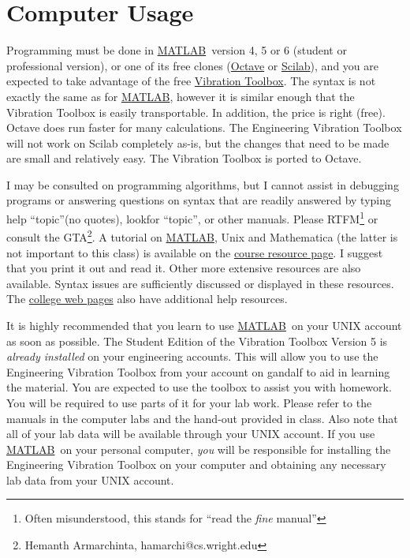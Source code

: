 \documentclass[10pt]{article}
\newcommand{\comp}[1]{{{\small\textsf{#1}}}}
\newcommand{\matlab}{\href{http://www.mathworks.com}{M{\small ATLAB}}}
\begin{document}
\section{Computer Usage}
Programming must be done in \matlab\  version 4, 5 or 6 (student or professional version), or one of its free clones (\href{http://www.octave.org/}{Octave} or \href{http://www-rocq.inria.fr/scilab/}{Scilab}), and you are expected to take advantage of the free \href{http://www.cs.wright.edu/vtoolbox}{Vibration Toolbox}.  The syntax is not exactly the same as for \matlab, however it is similar enough that the Vibration Toolbox is easily transportable. In addition, the price is right (free). Octave does run faster for many calculations. The Engineering Vibration Toolbox will not work on Scilab completely as-is, but the changes that need to be made are small and relatively easy. The Vibration Toolbox is ported to Octave.  

I may be consulted on programming algorithms, but I cannot assist in debugging programs or answering questions on syntax that are readily answered by typing \comp{help ``topic''}(no quotes),  \comp{lookfor ``topic''}, or other manuals. Please RTFM\footnote{Often misunderstood, this stands for ``read the \emph{fine} manual''} or consult the GTA\footnote{Hemanth Armarchinta, hamarchi@cs.wright.edu}.  A tutorial on \matlab, Unix and Mathematica (the latter is not important to this class) is available on the \href{http://www.cs.wright.edu/people/faculty/jslater/vibration.html}{course resource page}.  I suggest that you print it out and read it.  Other more extensive resources are also available.  Syntax issues are sufficiently discussed or displayed in these resources.  The \href{http://www.cs.wright.edu}{college web pages} also have additional help resources. 

It is highly recommended that you learn to use \matlab\  on your UNIX account as soon as possible.  The Student Edition of the Vibration Toolbox Version 5 is \emph{already installed} on your engineering accounts.  This will allow you to use the Engineering Vibration Toolbox from your account on \comp{gandalf} to aid in learning the material.  You are expected to use the toolbox to assist you with homework.  You will be required to use parts of it for your lab work.  Please refer to the manuals in the computer labs and the hand-out provided in class.  Also note that all of your lab data will be available through your UNIX account.  If you use \matlab\  on your personal computer, \emph{you} will be responsible for installing the Engineering Vibration Toolbox on your computer and obtaining any necessary lab data from your UNIX account.
\end{document}
